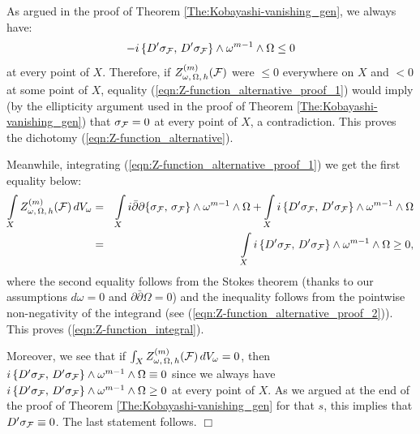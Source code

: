 \documentclass[12pt]{article}
\begin{document}
As argued in the proof of Theorem \ref{The:Kobayashi-vanishing_gen}, we always have: \begin{eqnarray}\label{eqn:Z-function_alternative_proof_2}- i\,\{D'\sigma_{{\cal F}},\,D'\sigma_{{\cal F}}\}\wedge\omega^{m-1}\wedge\Omega\leq 0\end{eqnarray} at every point of $X$. Therefore, if $Z_{\omega,\,\Omega,\,h}^{(m)}({\cal F})$ were $\leq 0$ everywhere on $X$ and $<0$ at some point of $X$, equality (\ref{eqn:Z-function_alternative_proof_1}) would imply (by the ellipticity argument used in the proof of Theorem \ref{The:Kobayashi-vanishing_gen}) that $\sigma_{{\cal F}} = 0$ at every point of $X$, a contradiction. This proves the dichotomy (\ref{eqn:Z-function_alternative}).

  Meanwhile, integrating (\ref{eqn:Z-function_alternative_proof_1}) we get the first equality below: \begin{eqnarray*}\int\limits_X Z_{\omega,\,\Omega,\,h}^{(m)}({\cal F})\,dV_\omega & = & \int\limits_X i\bar\partial\partial\{\sigma_{{\cal F}},\,\sigma_{{\cal F}}\}\wedge\omega^{m-1}\wedge\Omega + \int\limits_X i\,\{D'\sigma_{{\cal F}},\,D'\sigma_{{\cal F}}\}\wedge\omega^{m-1}\wedge\Omega \\
    & = & \int\limits_X i\,\{D'\sigma_{{\cal F}},\,D'\sigma_{{\cal F}}\}\wedge\omega^{m-1}\wedge\Omega \geq 0,\end{eqnarray*} where the second equality follows from the Stokes theorem (thanks to our assumptions $d\omega = 0$ and $\partial\bar\partial\Omega = 0$) and the inequality follows from the pointwise non-negativity of the integrand (see (\ref{eqn:Z-function_alternative_proof_2})). This proves (\ref{eqn:Z-function_integral}).

   Moreover, we see that if $\int_XZ_{\omega,\,\Omega,\,h}^{(m)}({\cal F})\,dV_\omega = 0$, then $i\,\{D'\sigma_{{\cal F}},\,D'\sigma_{{\cal F}}\}\wedge\omega^{m-1}\wedge\Omega \equiv 0$ since we always have $i\,\{D'\sigma_{{\cal F}},\,D'\sigma_{{\cal F}}\}\wedge\omega^{m-1}\wedge\Omega \geq 0$ at every point of $X$. As we argued at the end of the proof of Theorem \ref{The:Kobayashi-vanishing_gen} for that $s$, this implies that $D'\sigma_{{\cal F}}\equiv 0$. The last statement follows. \hfill $\Box$


\vspace{2ex}
\end{document}
